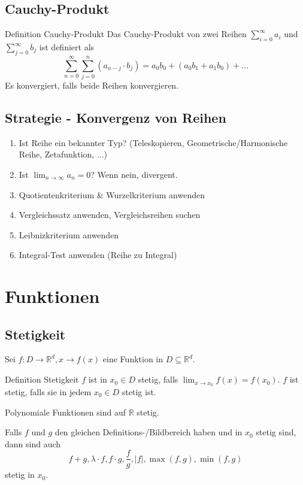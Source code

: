 \documentclass[a4paper,10pt]{article}
\def\limn{\lim_{n\to \infty}}
\def\R{\mathbb{R}}
\begin{document}
\subsection{Cauchy-Produkt}
\begin{subbox}{Definition Cauchy-Produkt}
  Das Cauchy-Produkt von zwei Reihen $\sum_{i = 0}^\infty a_i$ und $\sum_{j = 0}^\infty b_j$ ist definiert als
  $$\sum_{n=0}^\infty \sum_{j=0}^n (a_{n-j} \cdot b_j) = a_0b_0 + (a_0b_1 + a_1b_0) + \ldots$$ Es konvergiert, falls beide Reihen konvergieren.
\end{subbox}

\subsection{Strategie - Konvergenz von Reihen}
\begin{enumerate}
 \item Ist Reihe ein bekannter Typ? (Teleskopieren, Geometrische/Harmonische Reihe, Zetafunktion, ...)
 \item Ist $\limn a_n = 0$? Wenn nein, divergent.
 \item Quotientenkriterium \& Wurzelkriterium anwenden
 \item Vergleichssatz anwenden, Vergleichsreihen suchen
 \item Leibnizkriterium anwenden
 \item Integral-Test anwenden (Reihe zu Integral)
\end{enumerate}

\section{Funktionen}
\subsection{Stetigkeit}
Sei $f : D \to \R^d, x \to f(x)$ eine Funktion in $D \subseteq \R^d$.
\begin{mainbox}{Definition Stetigkeit}
 $f$ ist in $x_0 \in D$ stetig, falls $\lim_{x\to x_0} f(x) = f(x_0)$.
 $f$ ist stetig, falls sie in jedem $x_0 \in D$ stetig ist.
\end{mainbox}
Polynomiale Funktionen sind auf $\R$ stetig.
\begin{subbox}{}
 Falls $f$ und $g$ den gleichen Definitions-/Bildbereich haben und in $x_0$ stetig sind, dann sind auch $$f + g, \lambda \cdot f, f \cdot g, \frac{f}{g}, |f|, \max(f,g), \min(f,g)$$ stetig in $x_0$.
\end{subbox}
\end{document}
